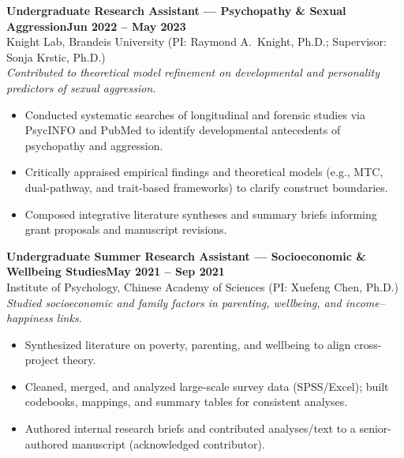 \documentclass[10pt, letterpaper]{article}
\newenvironment{expitems}{
    \begin{itemize}[
        leftmargin=8pt,
        itemsep=1pt,
        topsep=2pt,
        parsep=0pt,
        partopsep=0pt
    ]
}{\end{itemize}}
\newcommand{\expheading}[2]{\noindent\textbf{#1}\hfill\textbf{#2}\\}
\newcommand{\expinfo}[1]{\noindent #1\\}
\newcommand{\expscope}[1]{\noindent\textit{#1}\\}
\begin{document}
\vspace{2pt}
\expheading{Undergraduate Research Assistant — Psychopathy \& Sexual Aggression}{Jun 2022 -- May 2023}
\expinfo{Knight Lab, Brandeis University (PI: Raymond A.\ Knight, Ph.D.; Supervisor: Sonja Krstic, Ph.D.)}
\vspace{3pt}
\expscope{Contributed to theoretical model refinement on developmental and personality predictors of sexual aggression.}
\begin{expitems}
    \item Conducted systematic searches of longitudinal and forensic studies via PsycINFO and PubMed to identify developmental antecedents of psychopathy and aggression.
    \item Critically appraised empirical findings and theoretical models (e.g., MTC, dual-pathway, and trait-based frameworks) to clarify construct boundaries.
    \item Composed integrative literature syntheses and summary briefs informing grant proposals and manuscript revisions.
\end{expitems}

\vspace{2pt}
\expheading{Undergraduate Summer Research Assistant — Socioeconomic \& Wellbeing Studies}{May 2021 -- Sep 2021}
\expinfo{Institute of Psychology, Chinese Academy of Sciences (PI: Xuefeng Chen, Ph.D.)}
\vspace{3pt}
\expscope{Studied socioeconomic and family factors in parenting, wellbeing, and income–happiness links.}
\begin{expitems}
  \item Synthesized literature on poverty, parenting, and wellbeing to align cross-project theory.
  \item Cleaned, merged, and analyzed large-scale survey data (SPSS/Excel); built codebooks, mappings, and summary tables for consistent analyses.
  \item Authored internal research briefs and contributed analyses/text to a senior-authored manuscript (acknowledged contributor).
\end{expitems}



\vspace{4pt}
\end{document}

